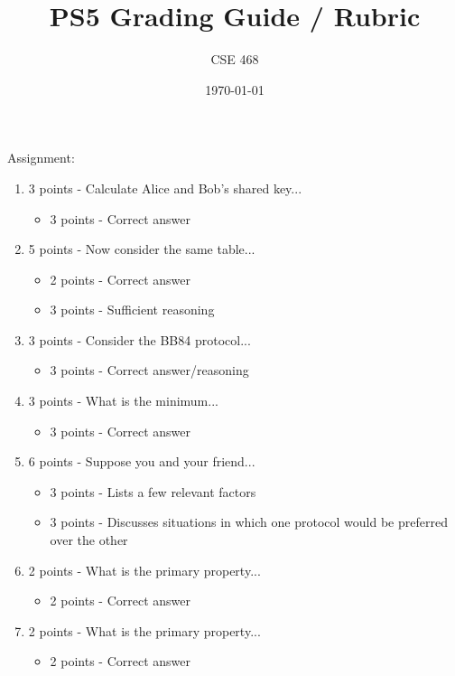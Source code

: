 \documentclass[12pt]{article}
\title{PS5 Grading Guide / Rubric}
\author{CSE 468}
\date{\today}
\begin{document}
\maketitle

Assignment: 
\begin{enumerate}[font=\bfseries]
    \item 3 points - Calculate Alice and Bob's shared key...
        \begin{itemize}
            \item 3 points - Correct answer
        \end{itemize}
    \item 5 points - Now consider the same table...
        \begin{itemize}
            \item 2 points - Correct answer
            \item 3 points - Sufficient reasoning
        \end{itemize}
    \item 3 points - Consider the BB84 protocol...
        \begin{itemize}
            \item 3 points - Correct answer/reasoning
        \end{itemize}
    \item 3 points - What is the minimum...
        \begin{itemize}
            \item 3 points - Correct answer
        \end{itemize}
    \item 6 points - Suppose you and your friend...
        \begin{itemize}
            \item 3 points - Lists a few relevant factors
            \item 3 points - Discusses situations in which one protocol would be preferred over the other
        \end{itemize}
    \item 2 points - What is the primary property...
        \begin{itemize}
            \item 2 points - Correct answer
        \end{itemize}
    \item 2 points - What is the primary property...
        \begin{itemize}
            \item 2 points - Correct answer

\end{itemize}
\end{enumerate}
\end{document}
